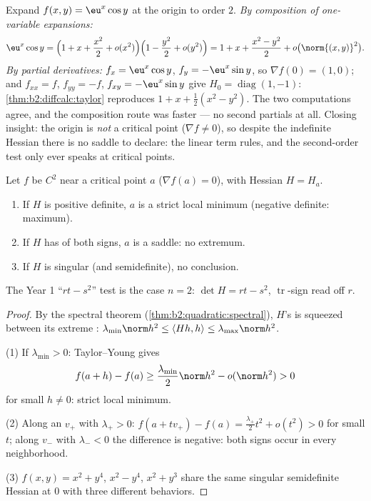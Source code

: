 \begin{example}\label{ex:b2:diffcalc:taylortwoways}
Expand $f(x, y) = \eu^x\cos y$ at the origin to order $2$.
\emph{By composition of one-variable expansions:}
\[
\eu^x\cos y = \Bigl(1 + x + \frac{x^2}{2} +
o(x^2)\Bigr)\Bigl(1 - \frac{y^2}{2} + o(y^2)\Bigr)
= 1 + x + \frac{x^2 - y^2}{2} + o\bigl(\norm{(x,y)}^2\bigr) .
\]
\emph{By partial derivatives:} $f_x = \eu^x\cos y$, $f_y =
-\eu^x\sin y$, so $\nabla f(0) = (1, 0)$; and $f_{xx} = f$,
$f_{yy} = -f$, $f_{xy} = -\eu^x\sin y$ give $H_0 =
\operatorname{diag}(1, -1)$: \cref{thm:b2:diffcalc:taylor}
reproduces $1 + x + \frac12(x^2 - y^2)$. The two computations
agree, and the composition route was faster --- no second
partials at all. Closing insight: the origin is \emph{not} a
critical point ($\nabla f \neq 0$), so despite the indefinite
Hessian there is no saddle to declare: the linear term rules,
and the second-order test only ever speaks at critical
points.
\end{example}

\begin{theorem}\label{thm:b2:diffcalc:extrema}
Let $f$ be $C^2$ near a critical point $a$ ($\nabla f(a) = 0$),
with Hessian $H = H_a$.
\begin{enumerate}
  \item If $H$ is positive definite, $a$ is a strict local minimum
        (negative definite: maximum).
  \item If $H$ has  of both signs, $a$ is a saddle: no
        extremum.
  \item If $H$ is singular (and semidefinite), no conclusion.
\end{enumerate}
The Year 1 ``$rt - s^2$'' test is the case $n = 2$: $\det H = rt -
s^2$, $\operatorname{tr}$-sign read off $r$.
\end{theorem}

\begin{proof}
By the spectral theorem (\cref{thm:b2:quadratic:spectral}), $H$'s
 is squeezed between its extreme :
$\lambda_{\min}\norm h^2 \leq \langle Hh, h\rangle \leq
\lambda_{\max}\norm h^2$.

(1) If $\lambda_{\min} > 0$: Taylor--Young gives
\[
f(a + h) - f(a) \geq \frac{\lambda_{\min}}{2}\norm h^2 -
o(\norm h^2) > 0
\]
for small $h \neq 0$: strict local minimum.

(2) Along an  $v_+$ with $\lambda_+ > 0$: $f(a + tv_+) -
f(a) = \frac{\lambda_+}{2}t^2 + o(t^2) > 0$ for small $t$; along
$v_-$ with $\lambda_- < 0$ the difference is negative: both signs
occur in every neighborhood.

(3) $f(x,y) = x^2 + y^4$, $x^2 - y^4$, $x^2 + y^3$ share the same
singular semidefinite Hessian at $0$ with three different
behaviors.
\end{proof}

